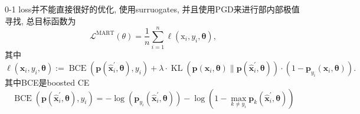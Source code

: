 \documentclass{article}
\begin{document}
{    0-1 loss并不能直接很好的优化, 使用surruogates, 并且使用PGD来进行部内部极值寻找, 总目标函数为
    \begin{equation}
        \mathcal{L}^{\mathrm{MART}}(\theta)=\frac{1}{n} \sum_{i=1}^{n} \ell\left(\mathrm{x}_{i}, y_{i}, \boldsymbol{\theta}\right),
    \end{equation}
    其中
    \begin{equation}
        \ell\left(\mathbf{x}_{i}, y_{i}, \boldsymbol{\theta}\right):=\operatorname{BCE}\left(\mathbf{p}\left(\hat{\mathbf{x}}_{i}^{\prime}, \boldsymbol{\theta}\right), y_{i}\right)+\lambda \cdot \operatorname{KL}\left(\mathbf{p}\left(\mathbf{x}_{i}, \boldsymbol{\theta}\right) \| \mathbf{p}\left(\hat{\mathbf{x}}_{i}^{\prime}, \boldsymbol{\theta}\right)\right) \cdot\left(1-\mathbf{p}_{y_{i}}\left(\mathbf{x}_{i}, \boldsymbol{\theta}\right)\right) .
    \end{equation}
    其中BCE是boosted CE
    \begin{equation}
        \operatorname{BCE}\left(\mathbf{p}\left(\hat{\mathbf{x}}_{i}^{\prime}, \boldsymbol{\theta}\right), y_{i}\right)=-\log \left(\mathbf{p}_{y_{i}}\left(\hat{\mathbf{x}}_{i}^{\prime}, \boldsymbol{\theta}\right)\right)-\log \left(1-\max _{k \neq y_{i}} \mathbf{p}_{k}\left(\hat{\mathbf{x}}_{i}^{\prime}, \boldsymbol{\theta}\right)\right)
    \end{equation}

}
\end{document}
